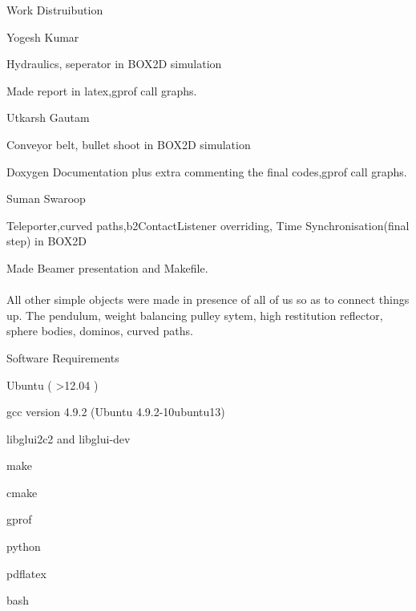\documentclass[a4paper,11pt]{resume}
\begin{document}
\newpage
\begin{rSection}{{\heading Work Distruibution}} 
\\
\begin{rSubsection}{{\heading Yogesh Kumar}}{}{}{}
\item Hydraulics, seperator in BOX2D simulation
\item Made report in latex,gprof call graphs.
\end{rSubsection}

\begin{rSubsection}{{\heading Utkarsh Gautam}}{}{}{}
\item Conveyor belt, bullet shoot in BOX2D simulation
\item Doxygen Documentation plus extra commenting the final codes,gprof call graphs.
\end{rSubsection}

\begin{rSubsection}{{\heading Suman Swaroop}}{}{}{}
\item Teleporter,curved paths,b2ContactListener overriding, Time Synchronisation(final step) in BOX2D
\item Made Beamer presentation and Makefile.
\\ \\
All other simple objects were made in presence of all of us so as to connect things up.
The pendulum, weight balancing pulley sytem, high restitution reflector, sphere bodies, dominos, curved paths. \\
\end{rSubsection}



\end{rSection}
\begin{rSection}{{\heading Software Requirements}} 
\\
\begin{rSubsection}{{\heading }}{}{}{}
\item Ubuntu ( \textgreater 12.04 )
\item gcc version 4.9.2 (Ubuntu 4.9.2-10ubuntu13) 
\item libglui2c2 and libglui-dev
\item make
\item cmake
\item gprof
\item python 
\item pdflatex
\item bash
\end{rSubsection}
\end{rSection}
\end{document}
